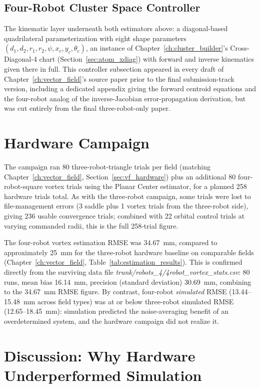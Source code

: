 \documentclass[12pt, letterpaper, oneside]{report}
\begin{document}
\subsection{Four-Robot Cluster Space Controller}

The kinematic layer underneath both estimators above: a diagonal-based
quadrilateral parameterization with eight shape parameters
$(d_1,d_2,r_1,r_2,\psi,x_c,y_c,\theta_c)$, an instance of
Chapter~\ref{ch:cluster_builder}'s Cross-Diagonal-4 chart
(Section~\ref{sec:atom_xdiag}) with forward and inverse kinematics
given there in full. This controller subsection appeared in every
draft of Chapter~\ref{ch:vector_field}'s source paper prior to the
final submission-track version, including a dedicated appendix giving
the forward centroid equations and the four-robot analog of the
inverse-Jacobian error-propagation derivation, but was cut entirely
from the final three-robot-only paper.

\section{Hardware Campaign}

The campaign ran 80 three-robot-triangle trials per field (matching
Chapter~\ref{ch:vector_field}, Section~\ref{sec:vf_hardware}) plus an
additional 80 four-robot-square vortex trials using the Planar Center
estimator, for a planned 258 hardware trials total. As with the
three-robot campaign, some trials were lost to file-management errors
(3 saddle plus 1 vortex trials from the three-robot side), giving 236
usable convergence trials; combined with 22 orbital control trials at
varying commanded radii, this is the full 258-trial figure.

The four-robot vortex estimation RMSE was 34.67~mm, compared to
approximately 25~mm for the three-robot hardware baseline on comparable
fields (Chapter~\ref{ch:vector_field}, Table~\ref{tab:estimation_results}).
This is confirmed directly from the surviving data file
\textit{trunk/robots\_4/4robot\_vortex\_stats.csv}: 80 runs, mean bias
16.14~mm, precision (standard deviation) 30.69~mm, combining to the
34.67~mm RMSE figure. By contrast, four-robot \emph{simulated} RMSE
(13.44--15.48~mm across field types) was at or below three-robot
simulated RMSE (12.65--18.45~mm): simulation predicted the
noise-averaging benefit of an overdetermined system, and the hardware
campaign did not realize it.

\section{Discussion: Why Hardware Underperformed Simulation}
\end{document}
